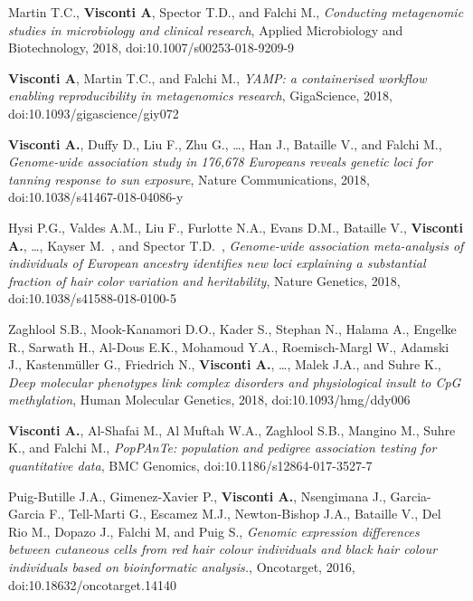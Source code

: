 \begin{itemize}
		 Martin T.C.\cofirst, \textbf{Visconti A}\cofirst, Spector T.D.\corresponding, and Falchi M.\corresponding, \emph{Conducting metagenomic studies in microbiology and clinical research}, Applied Microbiology and Biotechnology, 2018, doi:10.1007/s00253-018-9209-9 %
				
		 \textbf{Visconti A}\corresponding, Martin T.C., and Falchi M.\corresponding, \emph{YAMP: a containerised workflow enabling reproducibility in metagenomics research}, GigaScience, 2018, doi:10.1093/gigascience/giy072	%

		 \textbf{Visconti A.}, Duffy D., Liu F., Zhu G., \dots, Han J., Bataille V., and Falchi M.\corresponding, \emph{Genome-wide association study in 176,678 Europeans reveals genetic loci for tanning response to sun exposure}, Nature Communications, 2018, doi:10.1038/s41467-018-04086-y  
		
		 Hysi P.G.\cofirst, Valdes A.M.\cofirst, Liu F.\cofirst, Furlotte N.A., Evans D.M., Bataille V., \textbf{Visconti A.}, \dots, Kayser M.\colast ~\corresponding, and Spector T.D.\colast ~\corresponding, \emph{Genome-wide association meta-analysis of individuals of European ancestry identifies new loci explaining a substantial fraction of hair color variation and heritability}, Nature Genetics, 2018, doi:10.1038/s41588-018-0100-5  %
						
		 Zaghlool S.B., Mook-Kanamori D.O., Kader S., Stephan N., Halama A., Engelke R., Sarwath H., Al-Dous E.K., Mohamoud Y.A., Roemisch-Margl W., Adamski J., Kastenmüller G., Friedrich N., \textbf{Visconti A.}, \dots, Malek J.A., and Suhre K.\corresponding, \emph{Deep molecular phenotypes link complex disorders and physiological insult to CpG methylation}, Human Molecular Genetics, 2018, doi:10.1093/hmg/ddy006 %
				
		 \textbf{Visconti A.}\corresponding, Al-Shafai M.,  Al Muftah W.A.,  Zaghlool S.B., Mangino M., Suhre K., and Falchi M., \emph{PopPAnTe: population and pedigree association testing for quantitative data}, BMC Genomics, doi:10.1186/s12864-017-3527-7	%
				
		 Puig-Butille J.A.\corresponding, Gimenez-Xavier P., \textbf{Visconti A.}, Nsengimana J., Garcia-Garcia F., Tell-Marti G., Escamez M.J., Newton-Bishop J.A., Bataille V., Del Rio M., Dopazo J., Falchi M, and Puig S., \emph{Genomic expression differences between cutaneous cells from red hair colour individuals and black hair colour individuals based on bioinformatic analysis.}, Oncotarget, 2016, doi:10.18632/oncotarget.14140 %


\end{itemize}
